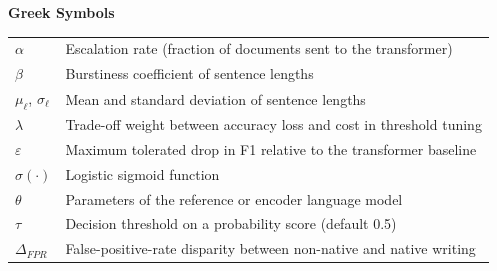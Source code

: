 \textbf{Greek Symbols}\par
\begin{longtable}{@{}p{3.0cm}p{11.0cm}@{}}
$\alpha$            & Escalation rate (fraction of documents sent to the transformer) \\
$\beta$             & Burstiness coefficient of sentence lengths \\
$\mu_\ell$, $\sigma_\ell$ & Mean and standard deviation of sentence lengths \\
$\lambda$           & Trade-off weight between accuracy loss and cost in threshold tuning \\
$\varepsilon$       & Maximum tolerated drop in F1 relative to the transformer baseline \\
$\sigma(\cdot)$     & Logistic sigmoid function \\
$\theta$            & Parameters of the reference or encoder language model \\
$\tau$              & Decision threshold on a probability score (default 0.5) \\
$\Delta_{FPR}$      & False-positive-rate disparity between non-native and native writing \\
\end{longtable}
\endgroup
\clearpage
